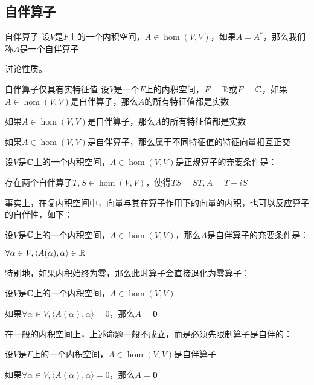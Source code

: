 \documentclass[12pt, a4paper, oneside, UTF8]{ctexbook}
\begin{document}
		\subsection{自伴算子}
			\begin{defn}{自伴算子}{}
				设$V$是$F$上的一个内积空间，$A \in \hom(V,V)$，如果$A=A^*$，那么我们称$A$是一个自伴算子
			\end{defn}
			讨论性质。
			\begin{para}{0}
				\point{}
					\begin{corollary}{自伴算子仅具有实特征值}
						设$V$是一个$F$上的内积空间，$F=\mathbb{R}$或$F=\mathbb{C}$，如果$A \in \hom(V,V)$是自伴算子，那么$A$的所有特征值都是实数
					\end{corollary}
				\point{}
					\begin{proposition}
						如果$A \in \hom(V,V)$是自伴算子，那么$A$的所有特征值都是实数
					\end{proposition}
				\point{}
					\begin{proposition}
						如果$A \in \hom(V,V)$是自伴算子，那么属于不同特征值的特征向量相互正交
					\end{proposition}
				\point{}
					\begin{proposition}
						设$V$是$\mathbb{C}$上的一个内积空间，$A \in \hom(V,V)$是正规算子的充要条件是：

						存在两个自伴算子$T,S \in \hom(V,V)$，使得$TS=ST,A=T+iS$
					\end{proposition}
					事实上，在复内积空间中，向量与其在算子作用下的向量的内积，也可以反应算子的自伴性，如下：
				\point{}
					\begin{proposition}
						设$V$是$\mathbb{C}$上的一个内积空间，$A \in \hom(V,V)$，那么$A$是自伴算子的充要条件是：

						$\forall \alpha\in V,\langle A(\alpha ),\alpha  \rangle \in \mathbb{R}$
					\end{proposition}
					特别地，如果内积始终为零，那么此时算子会直接退化为零算子：
					\begin{proposition}
						设$V$是$\mathbb{C}$上的一个内积空间，$A \in \hom(V,V)$
						
						如果$\forall \alpha \in V,\langle A(\alpha ),\alpha  \rangle =0$，那么$A=\mathbf{0}$
					\end{proposition}
					在一般的内积空间上，上述命题一般不成立，而是必须先限制算子是自伴的：
					\begin{proposition}
						设$V$是$F$上的一个内积空间，$A \in \hom(V,V)$是自伴算子
						
						如果$\forall \alpha \in V,\langle A(\alpha ),\alpha  \rangle =0$，那么$A=\mathbf{0}$
					\end{proposition}
			\end{para}
\end{document}

